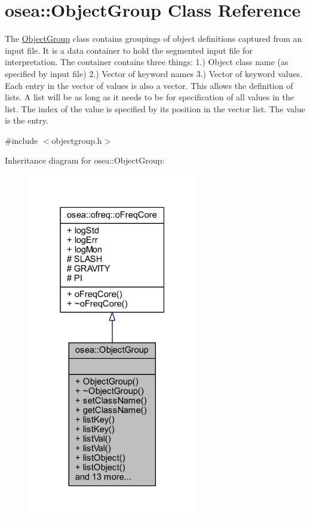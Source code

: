 \hypertarget{classosea_1_1_object_group}{\section{osea\-:\-:Object\-Group Class Reference}
\label{classosea_1_1_object_group}
}


The \hyperlink{classosea_1_1_object_group}{Object\-Group} class contains groupings of object definitions captured from an input file. It is a data container to hold the segmented input file for interpretation. The container contains three things\-: 1.) Object class name (as specified by input file) 2.) Vector of keyword names 3.) Vector of keyword values. Each entry in the vector of values is also a vector. This allows the definition of lists. A list will be as long as it needs to be for specification of all values in the list. The index of the value is specified by its position in the vector list. The value is the entry.  




{\ttfamily \#include $<$objectgroup.\-h$>$}



Inheritance diagram for osea\-:\-:Object\-Group\-:
\nopagebreak
\begin{figure}[H]
\begin{center}
\leavevmode
\includegraphics[width=210pt]{classosea_1_1_object_group__inherit__graph}
\end{center}
\end{figure}

